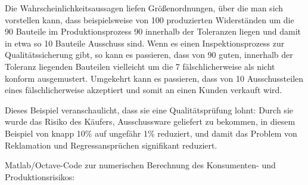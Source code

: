 Die Wahrscheinlichkeitsaussagen liefen Größenordnungen, über die man sich vorstellen kann,
dass beispielsweise von 100 produzierten Widerständen um die 90 Bauteile im Produktionsprozess 90 innerhalb der Toleranzen liegen und damit in etwa so 10 Bauteile Ausschuss sind. Wenn es
einen Inspektionsprozess zur Qualitätssicherung gibt, so kann es passieren, dass von 90 guten, innerhalb der Toleranz liegenden Bauteilen vielleicht um die 7 fälschlicherweise als nicht konform ausgemustert. Umgekehrt kann es passieren, dass von 10 Ausschussteilen eines fälschlicherweise akzeptiert und somit an einen Kunden verkauft wird.

Dieses Beispiel veranschaulicht, dass sie eine Qualitätsprüfung lohnt:
Durch sie wurde das Risiko des Käufers,
Ausschussware geliefert zu bekommen, in diesem Beispiel
von knapp 10\% auf ungefähr 1\% reduziert, und damit das
Problem von Reklamation und Regressansprüchen signifikant reduziert.

Matlab/Octave-Code zur numerischen Berechnung des Konsumenten- und Produktionsrisikos:

